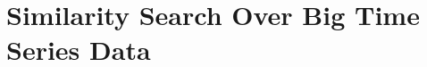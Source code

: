 \section{Similarity Search Over Big Time Series Data}\label{subchap:3_1}

\graphicspath{{SIGSpatial2018/}}







